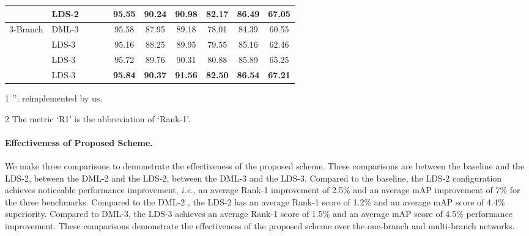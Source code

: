 \documentclass[a4paper]{cas-dc}
\begin{document}
\begin{table*}[t]
\begin{threeparttable}
\begin{tabular}{llccccccccc}
			& LDS-2    &  &              &               & 95.55  & 90.24    & 90.98     & 82.17   & 86.49  & 67.05   \\ \hline
			\multirow{4}{*}{3-Branch} 
			& DML-3\cite{RN187}\dag &              &              &                           & 95.58  & 87.95    & 89.18     & 78.01   & 84.39  & 60.55   \\
			& LDS-3    &              &              &               & 95.16  & 88.25    & 89.95     & 79.55   & 85.16  & 62.46   \\
			& LDS-3    &  &  &                           & 95.72  & 89.76    & 90.31     & 80.88   & 85.89  & 65.25   \\
			& LDS-3    &  &  &               & \textbf{95.84}    & \textbf{90.37 }   & \textbf{91.56}    & \textbf{82.50}  & \textbf{86.54}   & \textbf{67.21}   \\ \hline
		\end{tabular}
		\begin{tablenotes}
			\item[1] '\dag': reimplemented by us.
			\item[2] The metric `R1' is the abbreviation of `Rank-1'.
		\end{tablenotes}
	\end{threeparttable}
\end{table*}

\paragraph{Effectiveness of Proposed Scheme.}
We make three comparisons to demonstrate the effectiveness of the proposed scheme. These comparisons are between the baseline and the LDS-2, between the DML-2 and the LDS-2, between the DML-3 and the LDS-3. Compared to the baseline, the LDS-2 configuration achieves noticeable performance improvement, \textit{i.e.,} an average Rank-1 improvement of 2.5\% and an average mAP improvement of 7\% for the three benchmarks. Compared to the DML-2 \cite{RN187}, the LDS-2  has an average Rank-1 score of 1.2\% and an average mAP score of 4.4\% superiority. Compared to DML-3, the LDS-3 achieves an average Rank-1 score of 1.5\% and an average mAP score of 4.5\% performance improvement. These comparisons demonstrate the effectiveness of the proposed scheme over the one-branch and multi-branch networks. 
\end{document}
